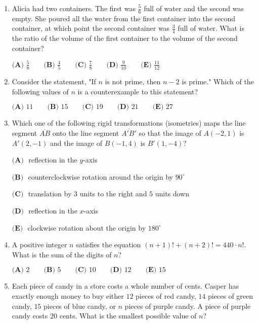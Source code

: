 \documentclass{article}
\begin{document}
\begin{enumerate}[label=\arabic*., itemsep=0.5em]\item Alicia had two containers. The first was \(\tfrac{5}{6}\) full of water and the second was empty. She poured all the water from the first container into the second container, at which point the second container was \(\tfrac{3}{4}\) full of water. What is the ratio of the volume of the first container to the volume of the second container?

\(\textbf{(A) } \frac{5}{8} \qquad \textbf{(B) } \frac{4}{5} \qquad \textbf{(C) } \frac{7}{8} \qquad \textbf{(D) } \frac{9}{10} \qquad \textbf{(E) } \frac{11}{12}\)\par \vspace{0.5em}\item Consider the statement, "If \(n\) is not prime, then \(n-2\) is prime." Which of the following values of \(n\) is a counterexample to this statement?

\(\textbf{(A) } 11 \qquad \textbf{(B) } 15 \qquad \textbf{(C) } 19 \qquad \textbf{(D) } 21 \qquad \textbf{(E) } 27\)\par \vspace{0.5em}\item Which one of the following rigid transformations (isometries) maps the line segment \(\overline{AB}\) onto the line segment \(\overline{A'B'}\) so that the image of \(A(-2,1)\) is \(A'(2,-1)\) and the image of \(B(-1,4)\) is \(B'(1,-4)?\)

\(\textbf{(A) } \) reflection in the \(y\)-axis

\(\textbf{(B) } \) counterclockwise rotation around the origin by \(90^{\circ}\)

\(\textbf{(C) } \) translation by \(3\) units to the right and \(5\) units down

\(\textbf{(D) } \) reflection in the \(x\)-axis

\(\textbf{(E) } \) clockwise rotation about the origin by \(180^{\circ}\)\par \vspace{0.5em}\item A positive integer \(n\) satisfies the equation \((n+1)!+(n+2)!=440\cdot n!\). What is the sum of the digits of \(n\)?

\(\textbf{(A) } 2 \qquad \textbf{(B) } 5 \qquad \textbf{(C) } 10\qquad \textbf{(D) } 12 \qquad \textbf{(E) } 15\)\par \vspace{0.5em}\item Each piece of candy in a store costs a whole number of cents. Casper has exactly enough money to buy either \(12\) pieces of red candy, \(14\) pieces of green candy, \(15\) pieces of blue candy, or \(n\) pieces of purple candy. A piece of purple candy costs \(20\) cents. What is the smallest possible value of \(n\)?


\end{enumerate}
\end{document}
